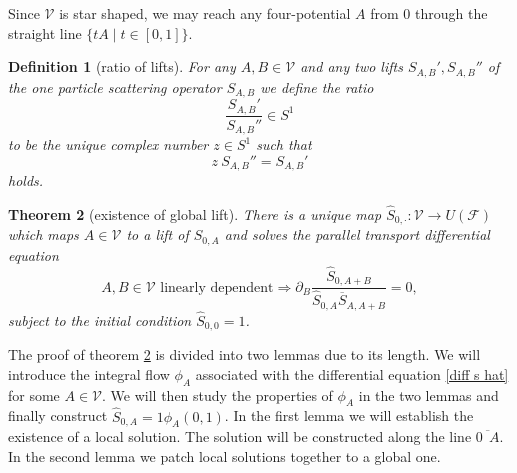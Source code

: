 \documentclass[b5paper,draft,openbib,12pt]{memoir}
\newtheorem{Def}{Definition}
\newtheorem{Thm}[Def]{Theorem}
\begin{document}
Since \(\mathcal{V}\) is star shaped, we may reach any four-potential \(A\) from \(0\) through the straight line
\(\{t A\mid t \in [0,1]\}\). 

\begin{Def}[ratio of lifts]\label{def:ratio}
For any  \(A,B\in\mathcal{V}\) and any two lifts \(S_{A,B}', S_{A,B}''\) of the one particle scattering operator \(S_{A,B}\)
we define the ratio
\begin{equation}
\frac{S_{A,B}'}{S_{A,B}''}\in S^1
\end{equation}
to be the unique complex number \(z\in S^1\) such that 
\begin{equation}
z ~S_{A,B}'' = S_{A,B}'
\end{equation}
holds.
\end{Def}

\begin{Thm}[existence of global lift]\label{thm: ex s hat}
  There is a unique map \(\hat{S}_{0,\cdot}:\mathcal{V}\to U(\mathcal{F})\) 
    which maps  \(A\in\mathcal{V}\) to a lift of \(S_{0,A}\) and solves the 
    parallel transport differential equation
  \begin{equation}\label{diff s hat}
A,B\in\mathcal{V}\text{ linearly dependent}\Rightarrow \partial_B \frac{\hat{S}_{0,A+B}}{\hat{S}_{0,A}\overline{S}_{A,A+B}}=0,
\end{equation}
subject to the initial condition \(\hat{S}_{0,0}=1\).
\end{Thm}

The proof of theorem \ref{thm: ex s hat} is divided into two lemmas due to its length. We will introduce the integral flow \(\phi_A\) associated 
with the differential equation \eqref{diff s hat} for some \(A\in\mathcal{V}\). We will then study the properties of \(\phi_A\)
in the two lemmas and finally construct \(\hat{S}_{0,A}=1 \phi_A(0,1)\). In the first lemma we will establish the existence of a 
local solution. The solution will be constructed along the line \(\overline{0 ~~ A}\). In the second lemma we patch local solutions together
to a global one.
\end{document}
